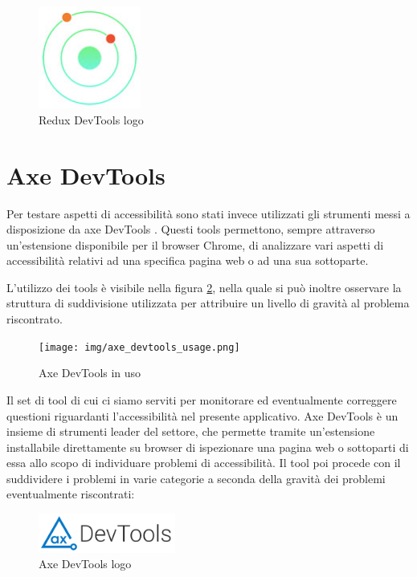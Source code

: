 \begin{figure}[H]
\centering
\includegraphics[width=0.3\textwidth]{img/logos/redux_devtool.jpg}
\caption{Redux DevTools logo}
\label{fig:reduxDevToolsLogo}
\end{figure}


\section{Axe DevTools}

Per testare aspetti di accessibilità sono stati invece utilizzati gli strumenti messi a disposizione da axe DevTools \cite{dequeDevToolsDeveloper}.
Questi tools permettono, sempre attraverso un'estensione disponibile per il browser Chrome, di analizzare vari aspetti di accessibilità relativi ad una specifica pagina web o ad una sua sottoparte. 

L'utilizzo dei tools è visibile nella figura \ref{fig:axeDevTools}, nella quale si può inoltre osservare la struttura di suddivisione utilizzata per attribuire un livello di gravità al problema riscontrato.


\begin{figure}[H]
\centering
\texttt{[image: img/axe\_devtools\_usage.png]}
\caption{Axe DevTools in uso}
\label{fig:axeDevTools}
\end{figure}

Il set di tool di cui ci siamo serviti per monitorare ed eventualmente correggere questioni riguardanti l'accessibilità nel presente applicativo. Axe DevTools è un insieme di strumenti leader del settore, che permette tramite un'estensione installabile direttamente su browser di ispezionare una pagina web o sottoparti di essa allo scopo di individuare problemi di accessibilità. Il tool poi procede con il suddividere i problemi in varie categorie a seconda della gravità dei problemi eventualmente riscontrati:

\begin{figure}[H]
\centering
\includegraphics[width=0.4\textwidth]{img/logos/axeDevtools_logo.png}
\caption{Axe DevTools logo}
\label{fig:axeDevToolsLogo}
\end{figure}


